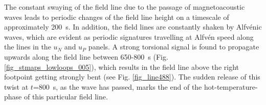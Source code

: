 \documentclass{aa}
\begin{document}
{%



The constant swaying of the field line due to the passage of magnetoacoustic waves leads to periodic changes of the field line height on a timescale of approximately 200~s. In addition, the field lines are constantly shaken by Alfv\'enic waves, which are evident as periodic signatures travelling at Alfv\'en speed along the lines in the $u_N$ and $u_P$ panels. %
A strong torsional signal is found to propagate upwards along the field line between 650-800~s (Fig. \ref{fig_stmaps_lowloops_005}), which results in the field line above the right footpoint getting strongly bent (see Fig. \ref{fig_line488}). The sudden release of this {\color{red}twist} at $t$=800~s, as the wave has passed, marks the end of the hot-temperature-phase of this particular field line. %

}
\end{document}
